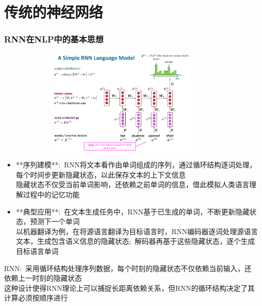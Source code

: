 \small
\section{传统的神经网络}
\begin{frame}
	\frametitle{\textrm{RNN}在\textrm{NLP}中的基本思想}
\begin{figure}[h!]
\vspace*{-0.05in}
\centering
\includegraphics[height=2.0in, width=4.0in, viewport=0 0 1080 510,clip]{Figures/RNN-Language-model.png}
\label{RNN-language-model}
\end{figure}
    \begin{itemize}
    \item **序列建模**:~\textrm{RNN}将文本看作由单词组成的序列，通过循环结构逐词处理，每个时间步更新隐藏状态，以此保存文本的上下文信息\\
	    隐藏状态不仅受当前单词影响，还依赖之前单词的信息，借此模拟人类语言理解过程中的记忆功能
    \item **典型应用**:~在文本生成任务中，\textrm{RNN}基于已生成的单词，不断更新隐藏状态，预测下一个单词\\
	    以机器翻译为例，在将源语言翻译为目标语言时，\textrm{RNN}编码器逐词处理源语言文本，生成包含语义信息的隐藏状态;~解码器再基于这些隐藏状态，逐个生成目标语言单词
    \end{itemize}
	    \textrm{RNN}:~采用循环结构处理序列数据，每个时刻的隐藏状态不仅依赖当前输入，还依赖上一时刻的隐藏状态\\
		    这种设计使得\textrm{RNN}理论上可以捕捉长距离依赖关系，但\textrm{RNN}的循环结构决定了其计算必须按顺序进行
\end{frame}

